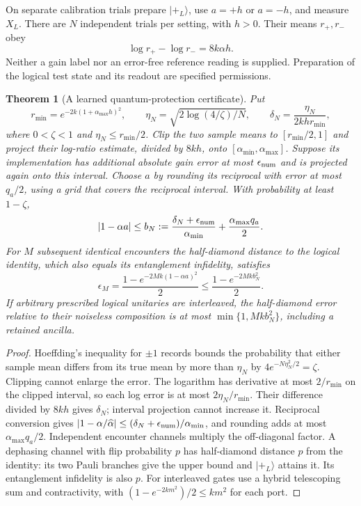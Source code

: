 \documentclass[11pt]{article}
\newtheorem{theorem}{Theorem}[section]
\theoremstyle{definition}
\theoremstyle{remark}
\begin{document}
On separate calibration trials prepare $|+_L\rangle$, use $a=+h$ or
$a=-h$, and measure $X_L$. There are $N$ independent trials per setting,
with $h>0$. Their means $r_+,r_-$ obey
\begin{equation}
 \log r_+-\log r_-=8k\alpha h.
 \label{eq:calibration_contrast}
\end{equation}
Neither a gain label nor an error-free reference reading is supplied.
Preparation of the logical test state and its readout are specified permissions.

\begin{theorem}[A learned quantum-protection certificate]
\label{thm:quantum_certificate}
Put
\[
 r_{\min}=e^{-2k(1+\alpha_{\max}h)^2},\qquad
 \eta_N=\sqrt{2\log(4/\zeta)/N},\qquad
 \delta_N=\frac{\eta_N}{2kh r_{\min}},
\]
where $0<\zeta<1$ and $\eta_N\le r_{\min}/2$.
Clip the two sample means to $[r_{\min}/2,1]$ and project
their log-ratio estimate, divided by $8kh$, onto
$[\alpha_{\min},\alpha_{\max}]$. Suppose its implementation has additional
absolute gain error at most $\epsilon_{\rm num}$ and is projected again
onto this interval. Choose $a$ by rounding its reciprocal with error at
most $q_a/2$, using a grid that covers the reciprocal interval.
With probability at least $1-\zeta$,
\begin{equation}
 |1-\alpha a|\le b_N:=
 \frac{\delta_N+\epsilon_{\rm num}}{\alpha_{\min}}
       +\frac{\alpha_{\max}q_a}{2}.
 \label{eq:quantum_mismatch_bound}
\end{equation}
For $M$ subsequent identical encounters the half-diamond distance to the
logical identity, which also equals its entanglement infidelity, satisfies
\begin{equation}
 \epsilon_M=\frac{1-e^{-2Mk(1-\alpha a)^2}}2
       \le\frac{1-e^{-2Mk b_N^2}}2.
 \label{eq:quantum_lifetime}
\end{equation}
If arbitrary prescribed logical unitaries are interleaved, the
half-diamond error relative to their noiseless composition is at most
$\min\{1,Mkb_N^2\}$, including a retained ancilla.
\end{theorem}
\begin{proof}
Hoeffding's inequality for $\pm1$ records bounds the probability that
either sample mean differs from its true mean by more than $\eta_N$
by $4e^{-N\eta_N^2/2}=\zeta$. Clipping cannot enlarge the error. The
logarithm has derivative at most $2/r_{\min}$ on the clipped interval,
so each log error is at most $2\eta_N/r_{\min}$. Their difference divided
by $8kh$ gives $\delta_N$; interval projection cannot increase it.
Reciprocal conversion gives
$|1-\alpha/\widehat\alpha|\le
 (\delta_N+\epsilon_{\rm num})/\alpha_{\min}$, and rounding adds
at most $\alpha_{\max}q_a/2$.
Independent encounter channels multiply the off-diagonal factor.
A dephasing channel with flip probability $p$ has half-diamond distance
$p$ from the identity: its two Pauli branches give the upper bound and
$|+_L\rangle$ attains it. Its entanglement infidelity is also $p$.
For interleaved gates use a hybrid telescoping sum and contractivity,
with $(1-e^{-2km^2})/2\le km^2$ for each port.
\end{proof}
\end{document}
